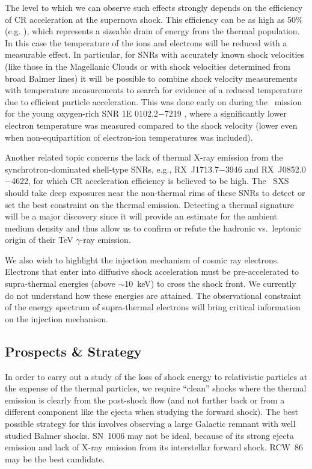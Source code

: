\documentclass[11pt,a4paper]{article}
\begin{document}
{The level to which we can observe such effects strongly depends on the efficiency of CR acceleration at the supernova shock. 
This efficiency can be as high as 50\% (e.g. \citealt{morlino13, helder09}), which represents a sizeable drain
of energy from the thermal population. In this case the temperature of
the ions and electrons will be reduced with a measurable effect. 
In particular, for SNRs with accurately
known shock velocities (like those in the Magellanic Clouds or with
shock velocities determined from broad Balmer lines) it will be
possible to combine shock velocity measurements with temperature
measurements to search for evidence of a reduced temperature due to
efficient particle acceleration.  This was done early on during the
\chandra\ mission for the young oxygen-rich SNR 1E 0102.2$-$7219
\citep{hughes00a}, where a significantly lower electron temperature
was measured compared to the shock velocity (lower even when
non-equipartition of electron-ion temperatures was included).


Another related topic concerns the lack of thermal X-ray emission from the
synchrotron-dominated shell-type SNRs, e.g., RX~J1713.7$-$3946 and RX~J0852.0$-$4622, 
for which CR acceleration efficiency is believed to be high.  The
\ah\ SXS should take deep exposures near the non-thermal rims of these
SNRs to detect or set the best constraint on the thermal emission.
Detecting a thermal signature will be a major discovery since it will
provide an estimate for the ambient medium density and thus allow us
to confirm or refute the hadronic vs.\ leptonic origin of their TeV
$\gamma$-ray emission.

We also wish to highlight the injection mechanism of cosmic ray
electrons.  Electrons that enter into diffusive shock acceleration
must be pre-accelerated to supra-thermal energies (above $\sim$10~keV)
to cross the shock front. We currently do not understand how these
energies are attained. The observational constraint of the energy
spectrum of supra-thermal electrons will bring critical information on
the injection mechanism.

\subsection{Prospects \& Strategy}

In order to carry out a study of the loss of shock energy to
relativistic particles at the expense of the thermal particles, we
require ``clean'' shocks where the thermal emission is clearly from
the post-shock flow (and not further back or from a different
component like the ejecta when studying the forward shock).  The best
possible strategy for this involves observing a large Galactic remnant
with well studied Balmer shocks.  SN~1006 may not be ideal, because of
its strong ejecta emission and lack of X-ray emission from its
interstellar forward shock. RCW~86 may be the best candidate.

}
\end{document}
